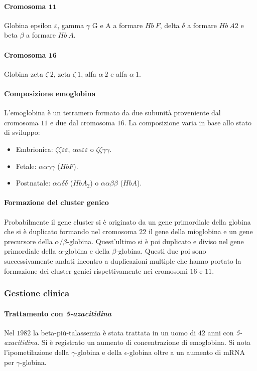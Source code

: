 \paragraph{Cromosoma $\mathbf{11}$}
Globina epsilon $\varepsilon$, gamma $\gamma$ G e A a formare $Hb\ F$, delta $\delta$ a formare $Hb\ A2$ e beta $\beta$ a formare $Hb\ A$.
\paragraph{Cromosoma $\mathbf{16}$}
Globina zeta $\zeta\ 2$, zeta $\zeta\ 1$, alfa $\alpha\ 2$  e alfa $\alpha\ 1$.
\paragraph{Composizione emoglobina}
L'emoglobina \`e un tetramero formato da due subunit\`a proveniente dal cromosoma $11$ e due dal cromosoma $16$. La composizione varia in base allo stato di sviluppo:
\begin{itemize}
	\item Embrionica: $\zeta\zeta\varepsilon\varepsilon$, $\alpha\alpha\varepsilon\varepsilon$ o $\zeta\zeta\gamma\gamma$.
	\item Fetale: $\alpha\alpha\gamma\gamma$ ($HbF$).
	\item Postnatale: $\alpha\alpha\delta\delta$ ($HbA_2$) o $\alpha\alpha\beta\beta$ ($HbA$). 
\end{itemize}
\paragraph{Formazione del cluster genico}
Probabilmente il gene cluster si \`e originato da un gene primordiale della globina che si \`e duplicato formando nel cromosoma $22$ il gene della mioglobina e un gene precursore
della $\alpha/\beta$-globina. Quest'ultimo si \`e poi duplicato e diviso nel gene primordiale della $\alpha$-globina e della $\beta$-globina. Questi due poi sono successivamente andati
incontro a duplicazioni multiple che hanno portato la formazione dei cluster genici rispettivamente nei cromosomi $16$ e $11$.
\subsubsection{Gestione clinica}
\paragraph{Trattamento con \emph{5-azacitidina}}
Nel $1982$ la beta-pi\`u-talassemia \`e stata trattata in un uomo di $42$ anni con \emph{5-azacitidina}. Si \`e registrato un aumento di concentrazione di emoglobina. Si nota
l'ipometilazione della $\gamma$-globina e della $\epsilon$-globina oltre a un aumento di mRNA per $\gamma$-globina.
